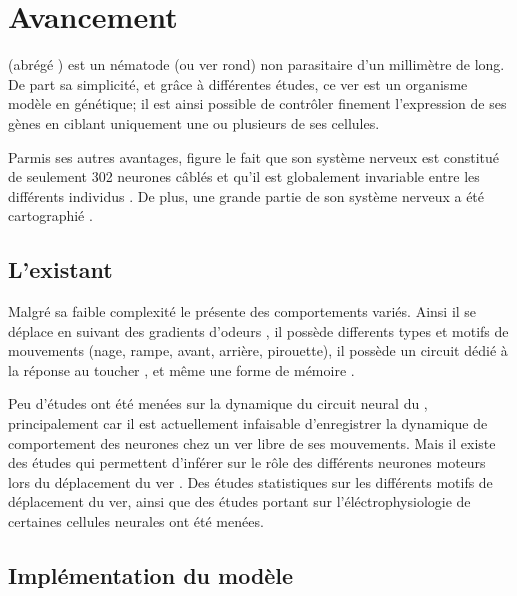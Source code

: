 \chapter{Avancement} %
\label{cha:Avancement}

\caeleg{} (abrégé \celeg{}) est un nématode (ou ver rond) non parasitaire d'un millimètre de long.
De part sa simplicité, et grâce à différentes études, ce ver est un organisme modèle en génétique;
il est ainsi possible de contrôler finement l'expression de ses gènes en ciblant uniquement une ou
plusieurs de ses cellules.

Parmis ses autres avantages, figure le fait que son système nerveux est constitué de seulement 302
neurones câblés et qu'il est globalement invariable entre les différents individus \cite{Boyle2009}.
De plus, une grande partie de son système nerveux a été cartographié
\cite{Durbin1987,Gray2005,Boyle2009,Varshney2011}.

\section{L'existant} %
\label{sec:L'existant}

Malgré sa faible complexité le \celeg{} présente des comportements variés. Ainsi il se déplace
en suivant des gradients d'odeurs \cite{Ferree1999,Gray2005}, il possède differents types et
motifs de mouvements (nage, rampe, avant, arrière, pirouette), il possède un circuit dédié à la 
réponse au toucher \cite{Chalfie1985}, et même une forme de mémoire \cite{Rankin2005a}.

Peu d'études ont été menées sur la dynamique du circuit neural du \celeg{}, principalement
car il est actuellement infaisable d'enregistrer la dynamique de comportement des neurones
chez un ver libre de ses mouvements.
Mais il existe des études qui permettent d'inférer sur le rôle des différents neurones moteurs
lors du déplacement du ver \cite{Yanik2006,Chronis2007,Leifer2011}.
Des études statistiques sur les différents motifs de déplacement \cite{Gray2005} du ver, ainsi que
des études portant sur l'éléctrophysiologie de certaines cellules neurales \cite{Mellem2008a,Lockery2009} ont été menées.


\section{Implémentation du modèle} %
\label{sub:Implémentation du modèle}

